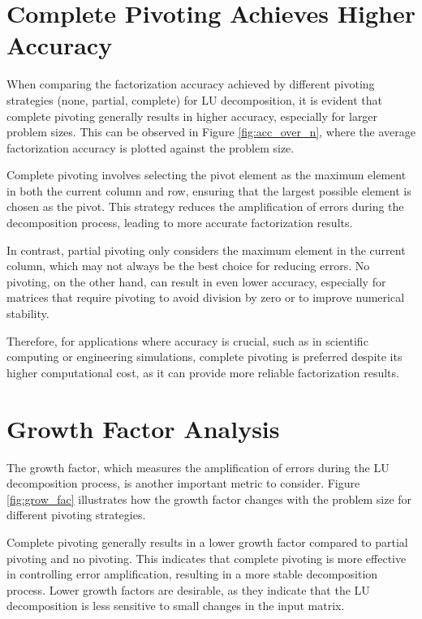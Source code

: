 \documentclass{article}
\begin{document}
\section{Complete Pivoting Achieves Higher Accuracy}

When comparing the factorization accuracy achieved by different pivoting strategies (none, partial, complete) for LU decomposition, it is evident that complete pivoting generally results in higher accuracy, especially for larger problem sizes. This can be observed in Figure \ref{fig:acc_over_n}, where the average factorization accuracy is plotted against the problem size.

Complete pivoting involves selecting the pivot element as the maximum element in both the current column and row, ensuring that the largest possible element is chosen as the pivot. This strategy reduces the amplification of errors during the decomposition process, leading to more accurate factorization results.

In contrast, partial pivoting only considers the maximum element in the current column, which may not always be the best choice for reducing errors. No pivoting, on the other hand, can result in even lower accuracy, especially for matrices that require pivoting to avoid division by zero or to improve numerical stability.

Therefore, for applications where accuracy is crucial, such as in scientific computing or engineering simulations, complete pivoting is preferred despite its higher computational cost, as it can provide more reliable factorization results.

\section{Growth Factor Analysis}

The growth factor, which measures the amplification of errors during the LU decomposition process, is another important metric to consider. Figure \ref{fig:grow_fac} illustrates how the growth factor changes with the problem size for different pivoting strategies.

Complete pivoting generally results in a lower growth factor compared to partial pivoting and no pivoting. This indicates that complete pivoting is more effective in controlling error amplification, resulting in a more stable decomposition process. Lower growth factors are desirable, as they indicate that the LU decomposition is less sensitive to small changes in the input matrix.
\end{document}
